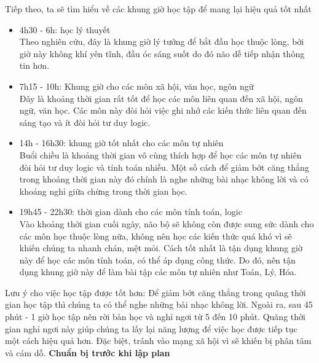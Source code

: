 Tiếp theo, ta sẽ tìm hiểu về các khung giờ học tập để mang lại hiệu quả tốt nhất
\begin{itemize}
    \item 4h30 - 6h: học lý thuyết\\
     Theo nghiên cứu, đây là khung giờ lý tưởng để bắt đầu học thuộc lòng, bởi giờ này không khí yên tĩnh, đầu óc sáng suốt do đó não dễ tiếp nhận thông tin hơn.
    \item 7h15 - 10h: Khung giờ cho các môn xã hội, văn học, ngôn ngữ \\
    Đây là khoảng thời gian rất tốt để học các môn liên quan đến xã hội, ngôn ngữ, văn học. Các môn này đòi hỏi việc ghi nhớ các kiến thức liên quan đến sáng tạo và ít đòi hỏi tư duy logic.
    \item 14h - 16h30: khung giờ tốt nhất cho các môn tự nhiên\\
    Buổi chiều là khoảng thời gian vô cùng thích hợp để học các môn tự nhiên đòi hỏi tư duy logic và tính toán nhiều. Một số cách để giảm bớt căng thẳng trong khoảng thời gian này đó chính là nghe những bài nhạc không lời và có khoảng nghỉ giữa chừng trong thời gian học.
    \item 19h45 - 22h30: thời gian dành cho các môn tính toán, logic\\
    Vào khoảng thời gian cuối ngày, não bộ sẽ không còn được sung sức dành cho các môn học thuộc lòng nữa,  không nên học các kiến thức quá khó vì sẽ khiến chúng ta nhanh chán, mệt mỏi. Cách tốt nhất là tận dụng khung giờ này để học các môn tính toán, có thể áp dụng công thức. Do đó, nên tận dụng khung giờ này để làm bài tập các môn tự nhiên như Toán, Lý, Hóa.
\end{itemize}
Lưu ý cho việc học tập được tốt hơn:  Để giảm bớt căng thẳng trong quãng thời gian học tập thì chúng ta có thể nghe những bài nhạc không lời. Ngoài ra, sau 45 phút - 1 giờ học tập nên rời bàn học và nghỉ ngơi từ 5 đến 10 phút. Quãng thời gian nghỉ ngơi này giúp chúng ta lấy lại năng lượng để việc học được tiếp tục một cách hiệu quả hơn. Đặc biệt, tránh vào mạng xã hội vì sẽ khiến bị phân tâm và cám dỗ.
\textbf{Chuẩn bị trước khi lập plan}
